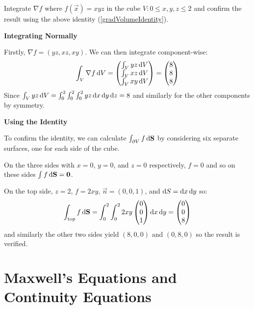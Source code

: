 \documentclass[../main.tex]{subfiles}
\begin{document}
\begin{example}
  Integrate $\nabla f$ where $f(\vec{x}) = xyz$ in the cube $V: 0 \leq x, y, z \leq 2$ and confirm the result using the above identity (\cref{gradVolumeIdentity}).

  \textbf{Integrating Normally}\par
  Firstly, $\nabla f = (yz, xz, xy)$.
  We can then integrate component-wise:
  \[
    \int_{V} \nabla f \d{V} = \begin{pmatrix}
    \int_{V} yz \d{V} \\
    \int_{V} xz \d{V} \\
    \int_{V} xy \d{V} \\
    \end{pmatrix} = \begin{pmatrix}
    8 \\
    8 \\
    8 \\
    \end{pmatrix}
  \]
  Since $\int_{V} yz \d{V} = \int_{0}^{2} \int_{0}^{2} \int_{0}^{2} yz \d{x} \d{y} \d{z} = 8$ and similarly for the other components by symmetry.

  \textbf{Using the Identity}\par
  To confirm the identity, we can calculate $\int_{\partial V}  f \d{\vec{S}}$ by considering six separate surfaces, one for each side of the cube.

  On the three sides with $x = 0$, $y = 0$, and $z = 0$ respectively, $f = 0$ and so on these sides $\int f \d{\vec{S}} = \vec{0}$.

  On the top side, $z = 2$, $f = 2xy$, $\vec{n} = (0, 0, 1)$, and $\d{S} = \d{x}\d{y}$ so:
  \[
    \int_{\text{top}} f \d{\vec{S}} = \int_{0}^{2} \int_{0}^{2} 2xy \begin{pmatrix}
    0 \\
    0 \\
    1 \\
    \end{pmatrix} \d{x} \d{y} = \begin{pmatrix}
    0 \\
    0 \\
    8 \\
    \end{pmatrix}
  \]
  and similarly the other two sides yield $(8, 0, 0)$ and $(0, 8, 0)$ so the result is verified.
\end{example}
\section{Maxwell's Equations and Continuity Equations}
\end{document}
